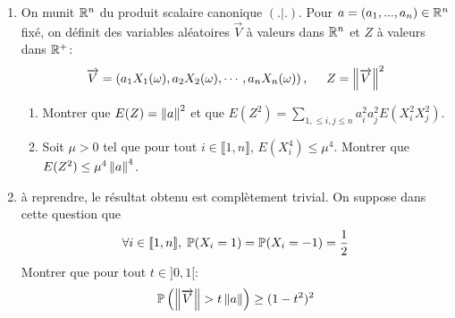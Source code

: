 \begin{enumerate}
 \item On munit $\mathbb{R}^{n}$ du produit scalaire canonique $(.|.)$.\newline
Pour $a = (a_{1},...,a_{n})\in \mathbb{R}^{n}$ fixé, on définit des variables aléatoires $\overrightarrow{V}$ à valeurs dans $\mathbb{R}^n$ et $Z$ à valeurs dans $\mathbb{R}^+$:
\begin{displaymath}
\overrightarrow{V} = \left( a_1X_1(\omega),a_2X_2(\omega),\cdots, a_nX_n(\omega)\right),\hspace{0.5cm}
Z = \left\Vert\overrightarrow{V}\right\Vert^2
\end{displaymath}
 \begin{enumerate}
  \item Montrer que $E(Z) = \left\Vert a\right\Vert^{2}$ et que $E(Z^{2}) = \displaystyle{\sum_{1,\leq i,j\leq n}a_{i}^{2}a_{j}^{2}E(X_{i}^{2}X_{j}^{2})}$.
  \item Soit $\mu >0$ tel que pour tout $i\in \llbracket 1, n\rrbracket$, $E(X_{i}^{4})\leq \mu^{4}$. Montrer que $E(Z^{2})\leq \mu^{4}\left\Vert a\right\Vert^{4}$. 
 \end{enumerate}

 \item à reprendre, le résultat obtenu est complètement trivial.\newline
 On suppose dans cette question que
\begin{displaymath}
\forall i \in \llbracket 1,n\rrbracket, \;  \mathbb{P}(X_{i}=1) = \mathbb{P}(X_{i}=-1) = \frac{1}{2}
\end{displaymath}
Montrer que pour tout $t\in ]0,1[$:
\begin{displaymath}
 \mathbb{P}\left ( \left\Vert\overrightarrow{V}\right\Vert > t\left\Vert a\right\Vert \right ) \geq (1-t^{2})^{2} 
\end{displaymath}

\end{enumerate}
